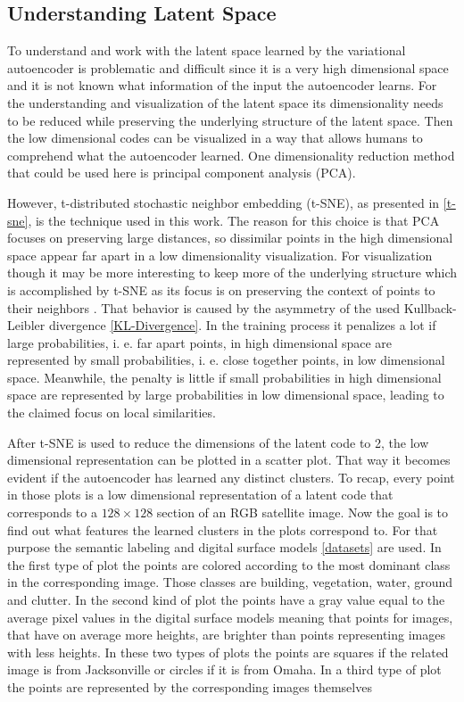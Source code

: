 \subsection{Understanding Latent Space}

To understand and work with the latent space learned by the variational autoencoder is problematic and
difficult since it is a very high dimensional space and it is not known what information of the input the
autoencoder learns. For the understanding and visualization of the latent space its dimensionality needs
to be reduced while preserving the underlying structure of the latent space. Then the low dimensional
codes can be visualized in a way that allows humans to comprehend what the autoencoder learned.
One dimensionality reduction method that could be used here is principal component analysis (PCA).

However,
t-distributed stochastic neighbor embedding (t-SNE), as presented in \ref{t-sne}, is the technique used in this work.
The reason for this choice is that PCA focuses on preserving large distances, so dissimilar points in the
high dimensional space appear far apart in a low dimensionality visualization. For visualization though
it may be more interesting to keep more of the underlying structure which is accomplished by t-SNE as its
focus is on preserving the context of points to their neighbors \parencite{2008-vanDerMaaten-visualizing}.
That behavior is caused by the asymmetry of the used Kullback-Leibler divergence \ref{KL-Divergence}.
In the training process it penalizes a lot if large probabilities, i. e. far apart points, in high dimensional
space are represented by small probabilities, i. e. close together points, in low dimensional space. Meanwhile, the 
penalty is little if small probabilities in high dimensional space are represented by large probabilities in
low dimensional space, leading to the claimed focus on local similarities.

After t-SNE is used to reduce the dimensions of the latent code to 2, the low dimensional representation can be
plotted in a scatter plot. That way it becomes evident if the autoencoder has learned any distinct clusters.
To recap, every point in those plots is a low dimensional representation of a latent code that corresponds to
a $128 \times 128$ section of an RGB satellite image. 
Now the goal is to find out what features the learned clusters in the plots correspond to. For that purpose the
semantic labeling and digital surface models \ref{datasets} are used. In the first type of plot the points
are colored according to the most dominant class in the corresponding image. Those classes are building, vegetation,
water, ground and clutter. In the second kind of plot the points have a gray value equal to the average pixel
values in the digital surface models meaning that points for images, that have on average more heights, are brighter
than points representing images with less heights.
In these two types of plots the points are squares if the related image is from Jacksonville or circles if it is from
Omaha. In a third type of plot the points are represented by the corresponding images themselves 

